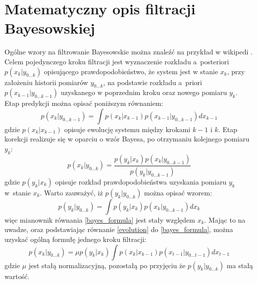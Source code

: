 \section{Matematyczny opis filtracji Bayesowskiej}
Ogólne wzory na filtrowanie Bayesowskie można znaleźć na przykład w wikipedi \cite{wiki_bayes_filter}. Celem pojedynczego kroku filtracji jest wyznaczenie rozkładu a~posteriori $p(x_{k}|y_{0...k})$ opisującego prawdopodobieństwo, że system jest w stanie $x_k$, przy założeniu historii pomiarów $y_{0...k}$, na podstawie rozkładu a~priori\break $p(x_{k-1}|y_{0...k-1})$ uzyskanego w poprzednim kroku oraz nowego pomiaru $y_k$. Etap predykcji można opisać poniższym równaniem:
\begin{equation} \label{evolution}
	p(x_k|y_{0...k-1})=\int p(x_k|x_{k-1})p(x_{k-1}|y_{0...k-1}) dx_{k-1}
\end{equation}
gdzie $p(x_k|x_{k-1})$ opisuje ewolucję systemu między krokami $k-1$ i $k$. Etap korekcji realizuje się w oparciu o wzór Bayesa, po otrzymaniu kolejnego pomiaru $y_k$:
\begin{equation}\label{bayes_formula}
	p(x_k|y_{0...k})=\frac{p(y_k|x_k)p(x_k|y_{0...k-1})}{p(y_k|y_{0...k-1})}
\end{equation}
gdzie $p(y_k|x_k)$ opisuje rozkład prawdopodobieństwa uzyskania pomiaru $y_k$ w~stanie $x_k$. Warto zauważyć, iż $p(y_k|y_{0...k})$ można opisać wzorem:
\begin{equation}
p(y_k|y_{0...k})=\int p(y_k|x_k)p(x_k|y_{0...k-1}) dx_k
\end{equation}
więc mianownik równania \ref{bayes_formula} jest stały względem $x_k$. Mając to na uwadze, oraz podstawiając równanie \ref{evolution} do \ref{bayes_formula}, można uzyskać ogólną formułę jednego kroku filtracji:
\begin{equation}
	p(x_k|y_{0...k})=\mu p(y_k|x_k)\int p(x_k|x_{k-1})p(x_{t-1}|y_{0...t-1}) dx_{t-1}
\end{equation}
gdzie $\mu$ jest stałą normalizacyjną, pozostałą po przyjęciu że $p(y_k|y_{0...k})$ ma stałą wartość.
